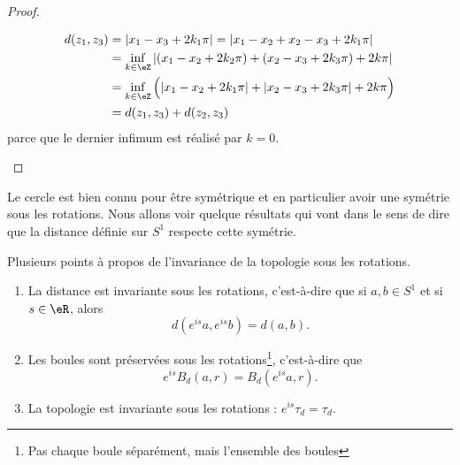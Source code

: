 \begin{proof}
\begin{enumerate}
\begin{itemize}
\begin{subequations}
                        \begin{align}
                            d(z_1,z_3)&=| x_1-x_3+2k_1\pi |=| x_1-x_2+x_2-x_3+2k_1\pi |\\
                            &=\inf_{k\in \eZ}| (x_1-x_2+2k_2\pi)+(x_2-x_3+2k_3\pi)+2k\pi |\\
                            &=\inf_{k\in \eZ}\Big( | x_1-x_2+2k_1\pi |+| x_2-x_3+2k_3\pi |+2k\pi \Big)\\
                            &=d(z_1,z_3)+d(z_2,z_3)
                        \end{align}
                    \end{subequations}
                    parce que le dernier infimum est réalisé par \( k=0\).
            \end{itemize}
        \end{enumerate}
\end{proof}

Le cercle est bien connu pour être symétrique et en particulier avoir une symétrie sous les rotations. Nous allons voir quelque résultats qui vont dans le sens de dire que la distance définie sur \( S^1\) respecte cette symétrie.

\begin{lemma}       \label{LEMooCQCAooAEctbe}
    Plusieurs points à propos de l'invariance de la topologie sous les rotations.
    \begin{enumerate}
        \item
            La distance est invariante sous les rotations, c'est-à-dire que si \( a,b\in S^1\) et si \( s\in \eR\), alors
            \begin{equation}
                d( e^{is}a, e^{is}b)=d(a,b).
            \end{equation}
        \item       \label{ITEMooCIPYooTyPQLj}
            Les boules sont préservées sous les rotations\footnote{Pas chaque boule séparément, mais l'ensemble des boules}, c'est-à-dire que
            \begin{equation}
                e^{is}B_d(a,r)=B_d( e^{is}a,r).
            \end{equation}
        \item
            La topologie est invariante sous les rotations : \(  e^{is}\tau_d=\tau_d\).
    \end{enumerate}
\end{lemma}

